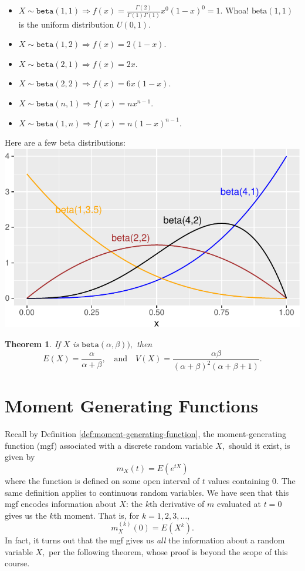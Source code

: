 \documentclass[
]{book}
\providecommand{\tightlist}{%
  \setlength{\itemsep}{0pt}\setlength{\parskip}{0pt}}
\newtheorem{theorem}{Theorem}[chapter]
\theoremstyle{definition}
\theoremstyle{definition}
\theoremstyle{definition}
\theoremstyle{definition}
\theoremstyle{remark}
\begin{document}
\begin{itemize}
\tightlist
\item
  \(\displaystyle X \sim \texttt{beta}(1,1) \Rightarrow f(x) = \frac{\Gamma(2)}{\Gamma(1)\Gamma(1)}x^0(1-x)^0 = 1\). Whoa! \(\text{beta}(1,1)\) is the uniform distribution \(U(0,1).\)
\item
  \(\displaystyle X \sim \texttt{beta}(1,2) \Rightarrow f(x) = 2(1-x)\).
\item
  \(\displaystyle X \sim \texttt{beta}(2,1) \Rightarrow f(x) = 2x\).
\item
  \(\displaystyle X \sim \texttt{beta}(2,2) \Rightarrow f(x) = 6x(1-x)\).
\item
  \(\displaystyle X \sim \texttt{beta}(n,1) \Rightarrow f(x) = nx^{n-1}\).
\item
  \(\displaystyle X \sim \texttt{beta}(1,n) \Rightarrow f(x) = n(1-x)^{n-1}\).
\end{itemize}

Here are a few beta distributions:
\includegraphics{math340-notes_files/figure-latex/unnamed-chunk-22-1.pdf}

\begin{theorem}
\protect\hypertarget{thm:beta-EandV}{}\label{thm:beta-EandV}If \(X\) is \(\texttt{beta}(\alpha,\beta)),\) then \[E(X) = \frac{\alpha}{\alpha+\beta}, ~~~ \text{ and } ~~~ V(X) = \frac{\alpha\beta}{(\alpha+\beta)^2(\alpha+\beta+1)}.\]
\end{theorem}

\chapter{Moment Generating Functions}\label{mgf}

Recall by Definition \ref{def:moment-generating-function}, the moment-generating function (mgf) associated with a discrete random variable \(X,\) should it exist, is given by \[m_X(t) = E(e^{tX})\] where the function is defined on some open interval of \(t\) values containing 0. The same definition applies to continuous random variables. We have seen that this mgf encodes information about \(X\): the \(k\)th derivative of \(m\) evaluated at \(t = 0\) gives us the \(k\)th moment. That is, for \(k = 1,2,3,\ldots,\)
\[m_X^{(k)}(0) = E(X^k).\]
In fact, it turns out that the mgf gives us \emph{all} the information about a random variable \(X,\) per the following theorem, whose proof is beyond the scope of this course.
\end{document}
